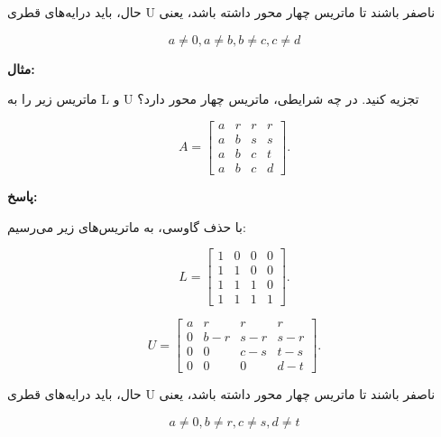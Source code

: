حال، باید درایه‌های قطری U ناصفر باشند تا ماتریس چهار محور داشته باشد، یعنی

$$ a \neq 0, a \neq b, b \neq c, c \neq d $$


\textbf{مثال:}

ماتریس زیر را به L و U تجزیه کنید. در چه شرایطی، ماتریس چهار محور دارد؟

\[A=
\begin{bmatrix}
a & r& r & r\\
a & b& s & s\\
a & b& c & t\\
a & b& c & d
\end{bmatrix}.
\]

\textbf{پاسخ:}

با حذف گاوسی، به ماتریس‌های زیر می‌رسیم:

\[L=
\begin{bmatrix}
1 & 0& 0 & 0\\
1 & 1& 0 & 0\\
1 & 1& 1 & 0\\
1 & 1& 1 & 1
\end{bmatrix}.
\]


\[U=
\begin{bmatrix}
a & r& r & r\\
0 & b-r& s-r & s-r\\
0 & 0& c-s & t-s\\
0 & 0& 0 & d-t
\end{bmatrix}.
\]



حال، باید درایه‌های قطری U ناصفر باشند تا ماتریس چهار محور داشته باشد، یعنی

$$ a \neq 0, b \neq r, c \neq s, d \neq t $$

